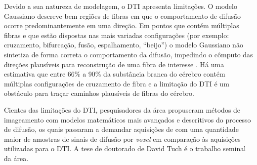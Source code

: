 \documentclass[
    12pt,                %
    oneside,            %
    a4paper,            %
    english,            %
    french,                %
    spanish,            %
    brazil                %
    ]{abntex2}
\begin{document}

Devido a sua natureza de modelagem, o DTI apresenta limitações. O modelo Gaussiano descreve bem regiões de fibras em que o comportamento de difusão ocorre predominantemente em uma direção. Em pontos que contém múltiplas fibras e que estão dispostas nas mais variadas configurações (por exemplo: cruzamento, bifurcação, fusão, espalhamento,  ``beijo'') o modelo Gaussiano não sintetiza de forma correta o comportamento da difusão, impedindo o cômputo das direções plausíveis para reconstrução de uma fibra de interesse \cite{fillard2011, daducci2014}. Há uma estimativa que entre 66\% a 90\% da substância branca do cérebro contém múltiplas configurações de cruzamento de fibra \cite{descoteaux2015} e a limitação do DTI é um obstáculo para traçar caminhos plausíveis de fibras do cérebro.

Cientes das limitações do DTI, pesquisadores da área propuseram métodos de imageamento com modelos matemáticos mais avançados e descritivos do processo de difusão, os quais passaram a demandar aquisições de com uma quantidade maior de amostras de sinais de difusão por \textit{voxel} em comparação às aquisições utilizadas para o DTI. %
A tese de doutorado de David Tuch \cite{tuch2002} é o trabalho seminal da área.
\end{document}
